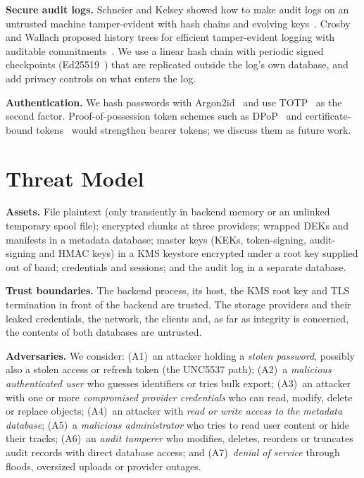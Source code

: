 \documentclass[conference]{IEEEtran}
\begin{document}
\textbf{Secure audit logs.} Schneier and Kelsey showed how to make audit logs on an untrusted machine tamper-evident with hash chains and evolving keys~\cite{schneier1999}. Crosby and Wallach proposed history trees for efficient tamper-evident logging with auditable commitments~\cite{crosby2009}. We use a linear hash chain with periodic signed checkpoints (Ed25519~\cite{rfc8032}) that are replicated outside the log's own database, and add privacy controls on what enters the log.

\textbf{Authentication.} We hash passwords with Argon2id~\cite{rfc9106} and use TOTP~\cite{rfc6238} as the second factor. Proof-of-possession token schemes such as DPoP~\cite{rfc9449} and certificate-bound tokens~\cite{rfc8705} would strengthen bearer tokens; we discuss them as future work.

\section{Threat Model}
\textbf{Assets.} File plaintext (only transiently in backend memory or an unlinked temporary spool file); encrypted chunks at three providers; wrapped DEKs and manifests in a metadata database; master keys (KEKs, token-signing, audit-signing and HMAC keys) in a KMS keystore encrypted under a root key supplied out of band; credentials and sessions; and the audit log in a separate database.

\textbf{Trust boundaries.} The backend process, its host, the KMS root key and TLS termination in front of the backend are trusted. The storage providers and their leaked credentials, the network, the clients and, as far as integrity is concerned, the contents of both databases are untrusted.

\textbf{Adversaries.} We consider:
(A1)~an attacker holding a \emph{stolen password}, possibly also a stolen access or refresh token (the UNC5537 path);
(A2)~a \emph{malicious authenticated user} who guesses identifiers or tries bulk export;
(A3)~an attacker with one or more \emph{compromised provider credentials} who can read, modify, delete or replace objects;
(A4)~an attacker with \emph{read or write access to the metadata database};
(A5)~a \emph{malicious administrator} who tries to read user content or hide their tracks;
(A6)~an \emph{audit tamperer} who modifies, deletes, reorders or truncates audit records with direct database access; and
(A7)~\emph{denial of service} through floods, oversized uploads or provider outages.
\end{document}
